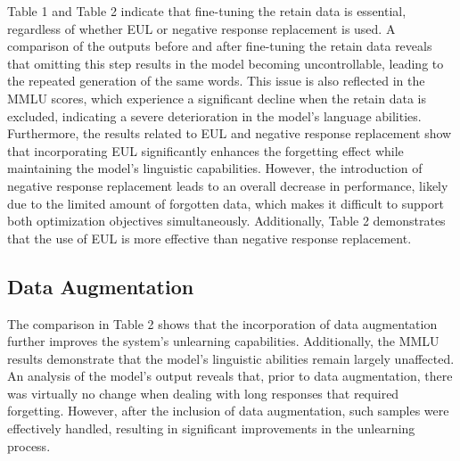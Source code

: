 \documentclass[11pt]{article}
\begin{document}

Table 1 and Table 2 indicate that fine-tuning the retain data is essential, regardless of whether EUL or negative response replacement is used. A comparison of the outputs before and after fine-tuning the retain data reveals that omitting this step results in the model becoming uncontrollable, leading to the repeated generation of the same words. This issue is also reflected in the MMLU scores, which experience a significant decline when the retain data is excluded, indicating a severe deterioration in the model's language abilities. Furthermore, the results related to EUL and negative response replacement show that incorporating EUL significantly enhances the forgetting effect while maintaining the model's linguistic capabilities. However, the introduction of negative response replacement leads to an overall decrease in performance, likely due to the limited amount of forgotten data, which makes it difficult to support both optimization objectives simultaneously. Additionally, Table 2 demonstrates that the use of EUL is more effective than negative response replacement.

\subsection{Data Augmentation} 

The comparison in Table 2 shows that the incorporation of data augmentation further improves the system's unlearning capabilities. Additionally, the MMLU results demonstrate that the model’s linguistic abilities remain largely unaffected. An analysis of the model's output reveals that, prior to data augmentation, there was virtually no change when dealing with long responses that required forgetting. However, after the inclusion of data augmentation, such samples were effectively handled, resulting in significant improvements in the unlearning process.
\fi
\end{document}
